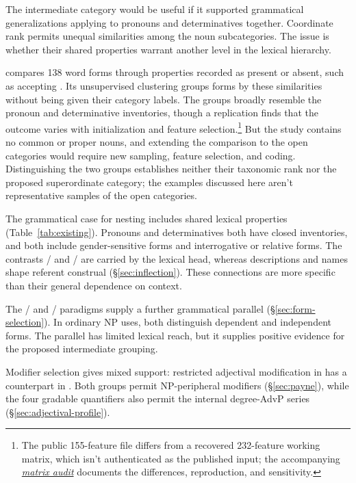 \documentclass[12pt]{article}
\begin{document}
The intermediate category would be useful if it supported grammatical generalizations applying to pronouns and determinatives together. Coordinate rank permits unequal similarities among the noun subcategories. The issue is whether their shared properties warrant another level in the lexical hierarchy.

\textcite{reynolds2021} compares 138 word forms through properties recorded as present or absent, such as accepting . Its unsupervised clustering groups forms by these similarities without being given their category labels. The groups broadly resemble the pronoun and determinative inventories, though a replication finds that the outcome varies with initialization and feature selection.\footnote{The public 155-feature file differs from a recovered 232-feature working matrix, which isn't authenticated as the published input; the accompanying \href{run:matrix-audit.pdf}{\textit{matrix audit}} documents the differences, reproduction, and sensitivity.} But the study contains no common or proper nouns, and extending the comparison to the open categories would require new sampling, feature selection, and coding. Distinguishing the two groups establishes neither their taxonomic rank nor the proposed superordinate category; the examples discussed here aren't representative samples of the open categories.

The grammatical case for nesting includes shared lexical properties (Table~\ref{tab:existing}). Pronouns and determinatives both have closed inventories, and both include gender-sensitive forms and interrogative or relative forms. The contrasts / and / are carried by the lexical head, whereas descriptions and names shape referent construal (§\ref{sec:inflection}). These connections are more specific than their general dependence on context.

The / and / paradigms supply a further grammatical parallel (§\ref{sec:form-selection}). In ordinary NP uses, both distinguish dependent and independent forms. The parallel has limited lexical reach, but it supplies positive evidence for the proposed intermediate grouping.

Modifier selection gives mixed support: restricted adjectival modification in  \citep[429--430]{huddleston2002} has a counterpart in . Both groups permit NP-peripheral modifiers (§\ref{sec:payne}), while the four gradable quantifiers also permit the internal degree-AdvP series (§\ref{sec:adjectival-profile}).
\end{document}
